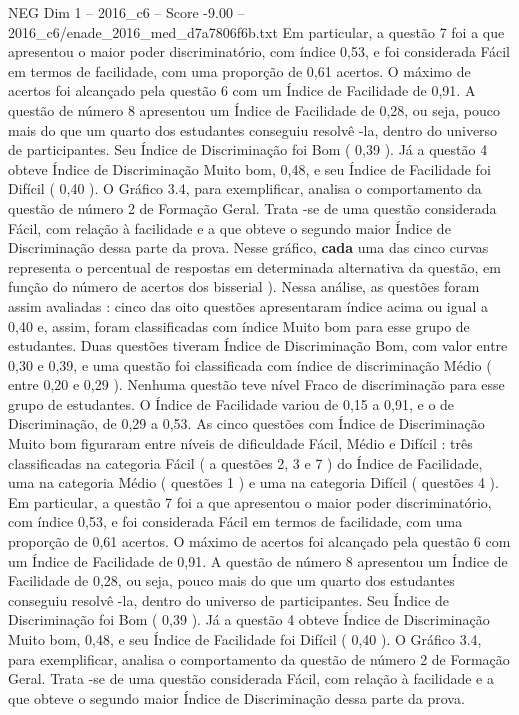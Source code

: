 \begin{textsample}{NEG Dim 1 – 2016\_c6 – Score -9.00 – 2016\_c6/enade\_2016\_med\_d7a7806f6b.txt}
Em particular, a questão 7 foi a que apresentou o maior poder discriminatório, com índice 0,53, e foi considerada Fácil em termos de facilidade, com uma proporção de 0,61 acertos.
O máximo de acertos foi alcançado pela questão 6 com um Índice de Facilidade de 0,91.
A questão de número 8 apresentou um Índice de Facilidade de 0,28, ou seja, pouco mais do que um quarto dos estudantes conseguiu resolvê -la, dentro do universo de participantes.
Seu Índice de Discriminação foi Bom ( 0,39 ).
Já a questão 4 obteve Índice de Discriminação Muito bom, 0,48, e seu Índice de Facilidade foi Difícil ( 0,40 ).
O Gráfico 3.4, para exemplificar, analisa o comportamento da questão de número 2 de Formação Geral.
Trata -se de uma questão considerada Fácil, com relação à facilidade e a que obteve o segundo maior Índice de Discriminação dessa parte da prova.
Nesse gráfico, \textbf{cada} uma das cinco curvas representa o percentual de respostas em determinada alternativa da questão, em função do número de acertos dos bisserial ).
Nessa análise, as questões foram assim avaliadas : cinco das oito questões apresentaram índice acima ou igual a 0,40 e, assim, foram classificadas com índice Muito bom para esse grupo de estudantes.
Duas questões tiveram Índice de Discriminação Bom, com valor entre 0,30 e 0,39, e uma questão foi classificada com índice de discriminação Médio ( entre 0,20 e 0,29 ).
Nenhuma questão teve nível Fraco de discriminação para esse grupo de estudantes.
O Índice de Facilidade variou de 0,15 a 0,91, e o de Discriminação, de 0,29 a 0,53.
As cinco questões com Índice de Discriminação Muito bom figuraram entre níveis de dificuldade Fácil, Médio e Difícil : três classificadas na categoria Fácil ( a questões 2, 3 e 7 ) do Índice de Facilidade, uma na categoria Médio ( questões 1 ) e uma na categoria Difícil ( questões 4 ).
Em particular, a questão 7 foi a que apresentou o maior poder discriminatório, com índice 0,53, e foi considerada Fácil em termos de facilidade, com uma proporção de 0,61 acertos.
O máximo de acertos foi alcançado pela questão 6 com um Índice de Facilidade de 0,91.
A questão de número 8 apresentou um Índice de Facilidade de 0,28, ou seja, pouco mais do que um quarto dos estudantes conseguiu resolvê -la, dentro do universo de participantes.
Seu Índice de Discriminação foi Bom ( 0,39 ).
Já a questão 4 obteve Índice de Discriminação Muito bom, 0,48, e seu Índice de Facilidade foi Difícil ( 0,40 ).
O Gráfico 3.4, para exemplificar, analisa o comportamento da questão de número 2 de Formação Geral.
Trata -se de uma questão considerada Fácil, com relação à facilidade e a que obteve o segundo maior Índice de Discriminação dessa parte da prova.

\end{textsample}

